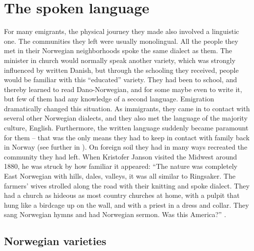 \documentclass[output=paper]{langscibook}
\begin{document}
\section{The spoken language}\label{sec:hjelde:7}

For many emigrants, the physical journey they made also involved a linguistic one. The communities they left were usually monolingual. All the people they met in their Norwegian neighborhoods spoke the same dialect as them. The minister in church would normally speak another variety, which was strongly influenced by written Danish, but through the schooling they received, people would be familiar with this “educated” variety. They had been to school, and thereby learned to read Dano-Norwegian, and for some maybe even to write it, but few of them had any knowledge of a second language. Emigration dramatically changed this situation. As immigrants, they came in to contact with several other Norwegian dialects, and they also met the language of the majority culture, English. Furthermore, the written language suddenly became paramount for them – that was the only means they had to keep in contact with family back in Norway (see further in ). On foreign soil they had in many ways recreated the community they had left. When Kristofer Janson visited the Midwest around 1880, he was struck by how familiar it appeared: “The nature was completely East Norwegian with hills, dales, valleys, it was all similar to Ringsaker. The farmers’ wives strolled along the road with their knitting and spoke dialect. They had a church as hideous as most country churches at home, with a pulpit that hung like a birdcage up on the wall, and with a priest in a dress and collar. They sang Norwegian hymns and had Norwegian sermon. Was this America?” \citep[180, my translation]{Janson1913}.

\subsection{Norwegian varieties}\label{sec:hjelde:7.1}
\end{document}
